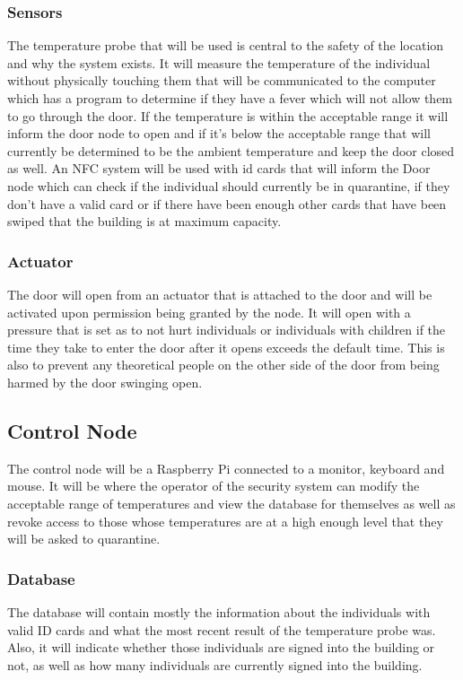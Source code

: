 \subsubsection{Sensors}
The temperature probe that will be used is central to the safety of the location
and why the system exists. It will measure the temperature of the individual
without physically touching them that will be communicated to the computer which
has a program to determine if they have a fever which will not allow them to go
through the door. If the temperature is within the acceptable range it will
inform the door node to open and if it's below the acceptable range that will
currently be determined to be the ambient temperature and keep the door closed
as well. An NFC system will be used with id cards that will inform the Door node
which can check if the individual should currently be in quarantine, if they
don't have a valid card or if there have been enough other cards that have been
swiped that the building is at maximum capacity.

\subsubsection{Actuator}
The door will open from an actuator that is attached to the door and will be
activated upon permission being granted by the node. It will open with a
pressure that is set as to not hurt individuals or individuals with children if
the time they take to enter the door after it opens exceeds the default time.
This is also to prevent any theoretical people on the other side of the door
from being harmed by the door swinging open.

\subsection{Control Node}
The control node will be a Raspberry Pi connected to a monitor, keyboard and
mouse. It will be where the operator of the security system can modify the
acceptable range of temperatures and view the database for themselves as well as
revoke access to those whose temperatures are at a high enough level that they
will be asked to quarantine.

\subsubsection{Database}
The database will contain mostly the information about the individuals with
valid ID cards and what the most recent result of the temperature probe was.
Also, it will indicate whether those individuals are signed into the building or
not, as well as how many individuals are currently signed into the building.

